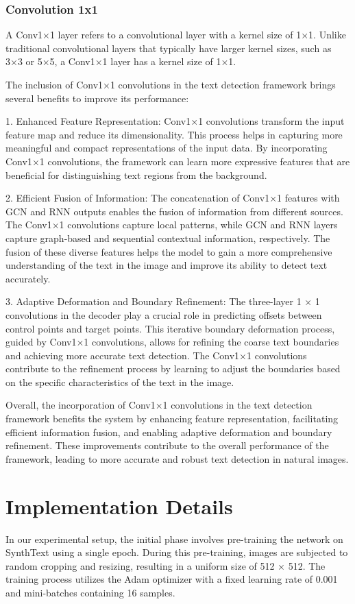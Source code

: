 \subsubsection{Convolution 1x1}

A Conv1×1 layer refers to a convolutional layer with a kernel size of 1×1. Unlike traditional convolutional layers that typically have larger kernel sizes, such as 3×3 or 5×5, a Conv1×1 layer has a kernel size of 1×1.

The inclusion of Conv1×1 convolutions in the text detection framework brings several benefits to improve its performance:

1. Enhanced Feature Representation: Conv1×1 convolutions transform the input feature map and reduce its dimensionality. This process helps in capturing more meaningful and compact representations of the input data. By incorporating Conv1×1 convolutions, the framework can learn more expressive features that are beneficial for distinguishing text regions from the background.

2. Efficient Fusion of Information: The concatenation of Conv1×1 features with GCN and RNN outputs enables the fusion of information from different sources. The Conv1×1 convolutions capture local patterns, while GCN and RNN layers capture graph-based and sequential contextual information, respectively. The fusion of these diverse features helps the model to gain a more comprehensive understanding of the text in the image and improve its ability to detect text accurately.

3. Adaptive Deformation and Boundary Refinement: The three-layer 1 × 1 convolutions in the decoder play a crucial role in predicting offsets between control points and target points. This iterative boundary deformation process, guided by Conv1×1 convolutions, allows for refining the coarse text boundaries and achieving more accurate text detection. The Conv1×1 convolutions contribute to the refinement process by learning to adjust the boundaries based on the specific characteristics of the text in the image.

Overall, the incorporation of Conv1×1 convolutions in the text detection framework benefits the system by enhancing feature representation, facilitating efficient information fusion, and enabling adaptive deformation and boundary refinement. These improvements contribute to the overall performance of the framework, leading to more accurate and robust text detection in natural images.

\section{Implementation Details}
In our experimental setup, the initial phase involves pre-training the network on SynthText using a single epoch. During this pre-training, images are subjected to random cropping and resizing, resulting in a uniform size of 512 × 512. The training process utilizes the Adam optimizer with a fixed learning rate of 0.001 and mini-batches containing 16 samples.

